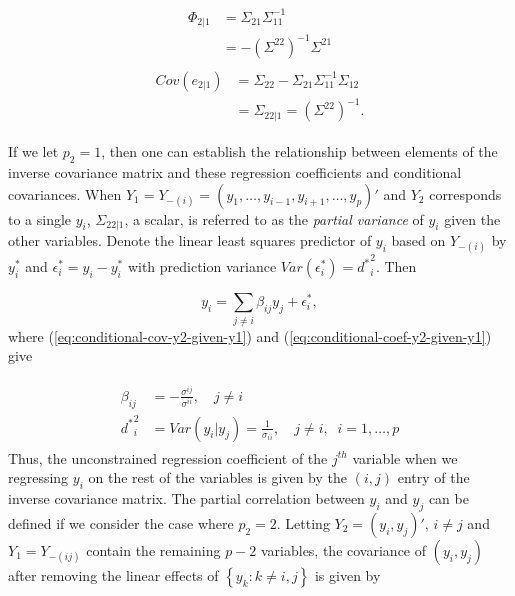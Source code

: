 \begin{align}
 \begin{split} \label{eq:conditional-coef-y2-given-y1}
 \Phi_{2\vert 1} &= \Sigma_{21}  \Sigma_{11}^{-1}  \\
 &= -\left( \Sigma^{22}\right)^{-1} \Sigma^{21} 
 \end{split}
 \end{align}
\begin{align}
 \begin{split} \label{eq:conditional-cov-y2-given-y1}
Cov\left(e_{2\vert 1}\right) &=  \Sigma_{22} - \Sigma_{21}\Sigma_{11}^{-1}\Sigma_{12}\\
&=  \Sigma_{22\vert 1}  = \left(\Sigma^{22} \right)^{-1}. 
 \end{split}
\end{align}

If we let $p_2 = 1$, then one can establish the relationship between elements of the inverse covariance matrix and these regression coefficients and conditional covariances. When $Y_1 = Y_{-\left(i\right)} = \left( y_1, \dots, y_{i-1}, y_{i+1},\dots, y_p \right)'$ and $Y_2$ corresponds to a single $y_i$, $\Sigma_{22\vert 1}$, a scalar, is referred to as the \textit{partial variance} of $y_i$ given the other variables.  Denote the linear least squares predictor of $y_i$ based on $Y_{-\left(i\right)}$ by $y^*_i$ and $\epsilon^*_i = y_i - y^*_i$ with prediction variance $Var\left(\epsilon^*_i \right) = {d^*}^2_i$. Then

\[
y_i = \sum_{j \ne i} \beta_{ij} y_j + \epsilon^*_i,
\] 
\noindent
where (\ref{eq:conditional-cov-y2-given-y1}) and (\ref{eq:conditional-coef-y2-given-y1}) give 

\begin{align}
 \begin{split} \label{eq:conditional-coef-y2-given-y1}
\beta_{ij} &= -\frac{\sigma^{ij}}{\sigma^{ii}}, \quad j \ne i \\
{d^*}_i^2 &= Var\left(y_i \vert y_j\right) =  \frac{1}{\sigma_{ii}},\quad j \ne i, \;\; i = 1,\dots, p
 \end{split}
\end{align}
\noindent
Thus, the unconstrained regression coefficient of the $j^{th}$ variable when we regressing $y_i$ on the rest of the variables is given by the $\left(i,j\right)$ entry of the inverse covariance matrix. The partial correlation between $y_i$ and $y_j$ can be defined if we consider the case where $p_2 = 2$. Letting $Y_2 = \left(y_i, y_j\right)'$, $i \ne j$ and $Y_1 = Y_{-\left(ij\right)}$ contain the remaining $p - 2$ variables, the covariance of $\left(y_i, y_j\right)$ after removing the linear effects of $\left\{ y_k : k \ne i,j\right\}$ is given by 

